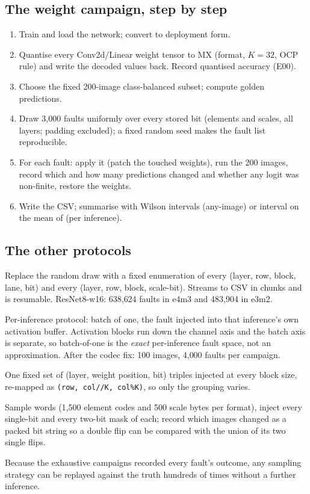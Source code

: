 \subsection{The weight campaign, step by step}
\begin{enumerate}
\item Train and load the network; convert to deployment form.
\item Quantise every Conv2d/Linear weight tensor to MX (format, $K=32$, OCP rule) and write the decoded values back. Record quantised accuracy (E00).
\item Choose the fixed 200-image class-balanced subset; compute golden predictions.
\item Draw 3{,}000 faults uniformly over every stored bit (elements and scales, all layers; padding excluded); a fixed random seed makes the fault list reproducible.
\item For each fault: apply it (patch the touched weights), run the 200 images, record which and how many predictions changed and whether any logit was non-finite, restore the weights.
\item Write the CSV; summarise with Wilson intervals (any-image) or interval on the mean of  (per inference).
\end{enumerate}

\subsection{The other protocols}
\begin{description}[leftmargin=1.2cm,style=nextline]
\item[Exhaustive (E06)] Replace the random draw with a fixed enumeration of every (layer, row, block, lane, bit) and every (layer, row, block, scale-bit). Streams to CSV in chunks and is resumable. ResNet8-w16: 638{,}624 faults in e4m3 and 483{,}904 in e3m2.
\item[Activations (E04)] Per-inference protocol: batch of one, the fault injected into that inference's own activation buffer. Activation blocks run down the channel axis and the batch axis is separate, so batch-of-one is the \emph{exact} per-inference fault space, not an approximation. After the codec fix: 100 images, 4{,}000 faults per campaign.
\item[Matched block-size study (E03b)] One fixed set of (layer, weight position, bit) triples injected at every block size, re-mapped as \texttt{(row, col//K, col\%K)}, so only the grouping varies.
\item[Multi-bit (E21)] Sample words (1{,}500 element codes and 500 scale bytes per format), inject every single-bit and every two-bit mask of each; record which images changed as a packed bit string so a double flip can be compared with the union of its two single flips.
\item[Replay studies (E15, E18--E22)] Because the exhaustive campaigns recorded every fault's outcome, any sampling strategy can be replayed against the truth hundreds of times without a further inference.
\end{description}

